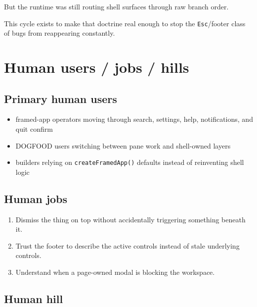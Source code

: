 But the runtime was still routing shell surfaces through raw branch order.

This cycle exists to make that doctrine real enough to stop the \texttt{E\allowbreak{}s\allowbreak{}c}/footer class of bugs from reappearing constantly.

\section{Human users / jobs / hills}\label{record-255-human-users-jobs-hills}

\subsection{Primary human users}\label{record-255-primary-human-users}

\begin{itemize}
\tightlist
\item
  framed-app operators moving through search, settings, help, notifications, and quit confirm
\item
  DOGFOOD users switching between pane work and shell-owned layers
\item
  builders relying on \texttt{c\allowbreak{}r\allowbreak{}e\allowbreak{}a\allowbreak{}t\allowbreak{}e\allowbreak{}F\allowbreak{}r\allowbreak{}a\allowbreak{}m\allowbreak{}e\allowbreak{}d\allowbreak{}A\allowbreak{}p\allowbreak{}p\allowbreak{}(\allowbreak{})} defaults instead of reinventing shell logic
\end{itemize}

\subsection{Human jobs}\label{record-255-human-jobs}

\begin{enumerate}
\def\labelenumi{\arabic{enumi}.}
\tightlist
\item
  Dismiss the thing on top without accidentally triggering something beneath it.
\item
  Trust the footer to describe the active controls instead of stale underlying controls.
\item
  Understand when a page-owned modal is blocking the workspace.
\end{enumerate}

\subsection{Human hill}\label{record-255-human-hill}

